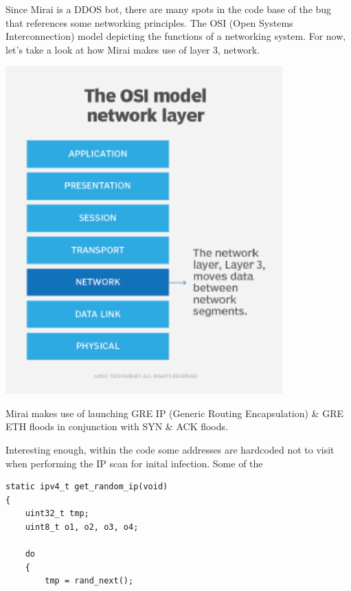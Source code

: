 \documentclass[12pt, letterpaper]{article}
\begin{document}
\begin{sloppypar}
\begin{flushleft}
Since Mirai is a DDOS bot, there are many spots in the code base of the bug that 
references some networking principles. The OSI (Open Systems Interconnection) model 
depicting the functions of a networking system. For now, let's take a look at how
Mirai makes use of layer 3, network. 
\begin{center}
{\includegraphics[width=0.8\textwidth]{osi-networking.png}}
\end{center}

Mirai makes use of launching GRE IP (Generic Routing Encapsulation) \& GRE ETH floods
in conjunction with SYN \& ACK floods.  


Interesting enough, within the code some addresses are hardcoded not to visit when
performing the IP scan for inital infection. Some of the 

\begin{verbatim}
static ipv4_t get_random_ip(void)
{
    uint32_t tmp;
    uint8_t o1, o2, o3, o4;

    do
    {
        tmp = rand_next();


\end{verbatim}
\end{flushleft}
\end{sloppypar}
\end{document}
